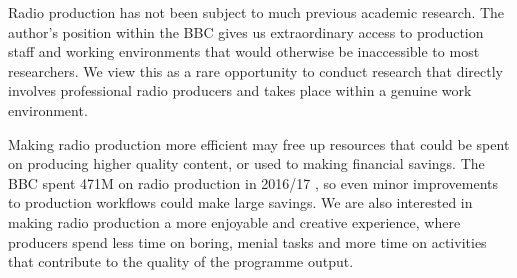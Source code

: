 




Radio production has not been subject to much previous academic research.  The author's position within the BBC gives
us extraordinary access to production staff and working environments that would otherwise be inaccessible to most
researchers. We view this as a rare opportunity to conduct research that directly involves professional radio producers
and takes place within a genuine work environment.

Making radio production more efficient may free up resources that could be spent on producing higher quality content,
or used to making financial savings. The BBC spent \textsterling471M on radio production in 2016/17 \citep[p.
111]{Ofcom2017}, so even minor improvements to production workflows could make large savings.  We are also interested
in making radio production a more enjoyable and creative experience, where producers spend less time on boring, menial
tasks and more time on activities that contribute to the quality of the programme output.

